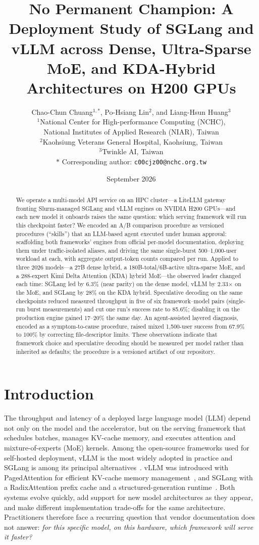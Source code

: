 \documentclass[11pt]{article}
\title{\textbf{No Permanent Champion: A Deployment Study of SGLang and vLLM across Dense, Ultra-Sparse MoE, and KDA-Hybrid Architectures on H200 GPUs}}
\author{
Chao-Chun Chuang$^{1,\ast}$, Po-Hsiang Lin$^{2}$, and Liang-Hsun Huang$^{3}$\\[4pt]
\small $^{1}$National Center for High-performance Computing (NCHC),\\
\small National Institutes of Applied Research (NIAR), Taiwan\\
\small $^{2}$Kaohsiung Veterans General Hospital, Kaohsiung, Taiwan\\
\small $^{3}$Twinkle AI, Taiwan\\[2pt]
\small $\ast$ Corresponding author: \texttt{c00cjz00@nchc.org.tw}
}
\date{September 2026}
\begin{document}
\maketitle

\begin{abstract}
\noindent We operate a multi-model API service on an HPC cluster---a LiteLLM gateway fronting Slurm-managed SGLang and vLLM engines on NVIDIA H200 GPUs---and each new model it onboards raises the same question: which serving framework will run this checkpoint faster? We encoded an A/B comparison procedure as versioned procedures (``skills'') that an LLM-based agent executed under human approval: scaffolding both frameworks' engines from official per-model documentation, deploying them under traffic-isolated aliases, and driving the same single-burst 500--1,000-user workload at each, with aggregate output-token counts compared per run. Applied to three 2026 models---a 27B dense hybrid, a 180B-total/6B-active ultra-sparse MoE, and a 288-expert Kimi Delta Attention (KDA) hybrid MoE---the observed leader changed each time: SGLang led by 6.3\% (near parity) on the dense model, vLLM by 2.33$\times$ on the MoE, and SGLang by 28\% on the KDA hybrid. Speculative decoding on the same checkpoints reduced measured throughput in five of six framework--model pairs (single-run burst measurements) and cut one run's success rate to 85.6\%; disabling it on the production engine gained 17--20\% the same day. An agent-assisted layered diagnosis, encoded as a symptom-to-cause procedure, raised mixed 1,500-user success from 67.9\% to 100\% by correcting file-descriptor limits. These observations indicate that framework choice and speculative decoding should be measured per model rather than inherited as defaults; the procedure is a versioned artifact of our repository.
\end{abstract}

\section{Introduction}

The throughput and latency of a deployed large language model (LLM) depend not only on the model and the accelerator, but on the serving framework that schedules batches, manages KV-cache memory, and executes attention and mixture-of-experts (MoE) kernels. Among the open-source frameworks used for self-hosted deployment, vLLM is the most widely adopted in practice and SGLang is among its principal alternatives~\cite{majidi2026wild}. vLLM was introduced with PagedAttention for efficient KV-cache memory management~\cite{kwon2023vllm}, and SGLang with a RadixAttention prefix cache and a structured-generation runtime~\cite{zheng2024sglang}. Both systems evolve quickly, add support for new model architectures as they appear, and make different implementation trade-offs for the same architecture. Practitioners therefore face a recurring question that vendor documentation does not answer: \emph{for this specific model, on this hardware, which framework will serve it faster?}
\end{document}

